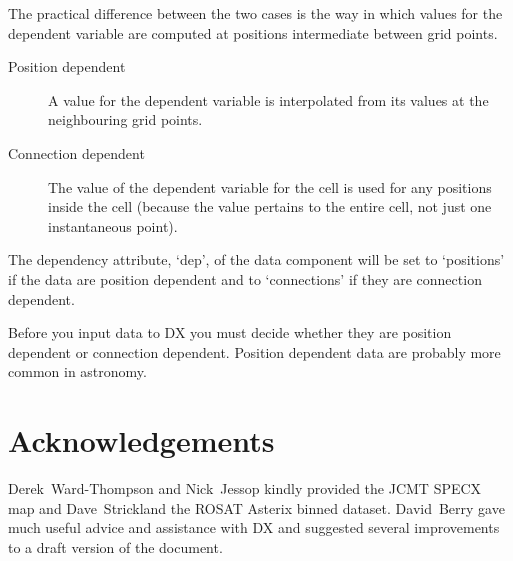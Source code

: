 \documentclass[twoside,11pt]{starlink}
\begin{document}
The practical difference between the two cases is the way in which
values for the dependent variable are computed at positions intermediate
between grid points.

\begin{description}

  \item[Position dependent] A value for the dependent variable is
   interpolated from its values at the neighbouring grid points.

  \item[Connection dependent] The value of the dependent variable for
   the cell is used for any positions inside the cell (because the
   value pertains to the entire cell, not just one instantaneous
   point).

\end{description}

The dependency attribute, `dep', of the data component will be set to
`positions' if the data are position dependent and to `connections' if
they are connection dependent.

Before you input data to DX you must decide whether they are position
dependent or connection dependent. Position dependent data are probably
more common in astronomy.


\newpage
\section{\label{ACK}Acknowledgements}

Derek~Ward-Thompson and Nick~Jessop kindly provided the JCMT SPECX map and
Dave~Strickland the ROSAT Asterix binned dataset.  David~Berry gave much
useful advice and assistance with DX and suggested several improvements to
a draft version of the document.
\end{document}
